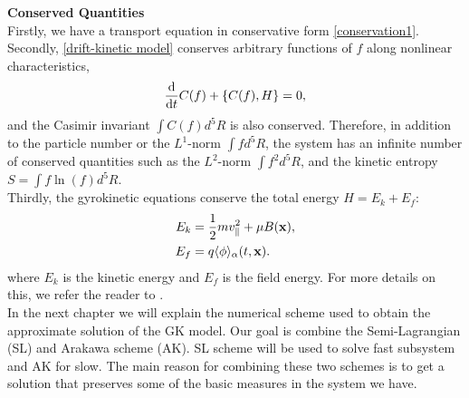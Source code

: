 \textbf{Conserved Quantities}\\
Firstly, we have a transport equation in conservative form \eqref{conservation1}. Secondly, \eqref{drift-kinetic model} conserves arbitrary functions of $f$  along nonlinear characteristics,
\begin{equation}
\frac{\text{d}}{\text{d} t} C(f) + \left\{ C(f), H \right\} =0,
\end{equation}
and the Casimir invariant $\int C( f ) d^5R$ is also conserved. Therefore, in addition to the particle number or the $L^1$-norm $\int f d^5R$, the system has an infinite number of conserved quantities such as the $L^2$-norm $\int f^2 d^5R$, and the kinetic entropy $S=\int f \ln(f) d^5R$.\\
Thirdly, the gyrokinetic equations conserve the total energy $H = E_k + E_f$:
\begin{subequations}
	\begin{align}
		E_k &= \frac{1}{2} m v_\parallel^2 + \mu B(\mathbf{x}),\\
		E_f &= q \langle \phi \rangle_\alpha (t,\mathbf{x}).
	\end{align}
\end{subequations}
where $E_k$ is the kinetic energy and $E_f$ is the field energy. For more details on this, we refer the reader to \cite{idomura2008conservative}.\\

In the next chapter we will explain the numerical scheme used to obtain the approximate solution of the GK model. Our goal is combine the Semi-Lagrangian (SL) and Arakawa scheme (AK). SL scheme will be used to solve fast subsystem and AK for slow. The main reason for combining these two schemes is to get a solution that preserves some of the basic measures in the system we have.